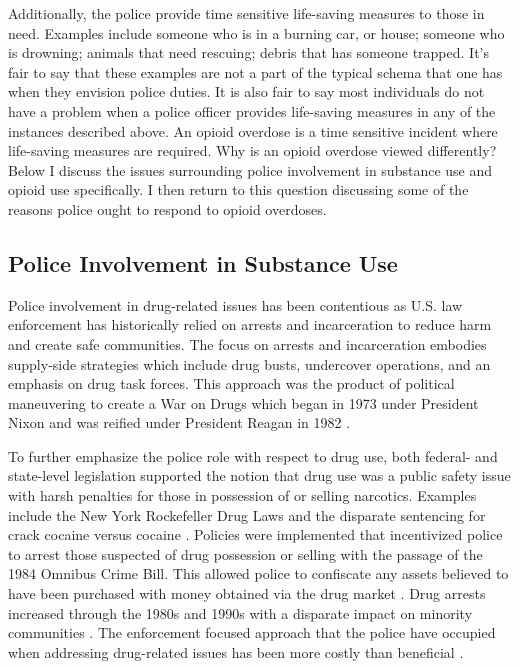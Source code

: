 Additionally, the police provide time sensitive life-saving measures to those in need. Examples include someone who is in a burning car, or house; someone who is drowning; animals that need rescuing; debris that has someone trapped. It's fair to say that these examples are not a part of the typical schema that one has when they envision police duties. It is also fair to say most individuals do not have a problem when a police officer provides life-saving measures in any of the instances described above. An opioid overdose is a time sensitive incident where life-saving measures are required. Why is an opioid overdose viewed differently? Below I discuss the issues surrounding police involvement in substance use and opioid use specifically. I then return to this question discussing some of the reasons police ought to respond to opioid overdoses. 
 
\subsection{Police Involvement in Substance Use}

Police involvement in drug-related issues has been contentious as U.S. law enforcement has historically relied on arrests and incarceration to reduce harm and create safe communities. The focus on arrests and incarceration embodies supply-side strategies which include drug busts, undercover operations, and an emphasis on drug task forces. This approach was the product of political maneuvering to create a War on Drugs which began in 1973 under President Nixon and was reified under President Reagan in 1982 \parencite{cooper_war_2015, lynch_theorizing_2012}.

To further emphasize the police role with respect to drug use, both federal- and state-level legislation supported the notion that drug use was a public safety issue with harsh penalties for those in possession of or selling narcotics. Examples include the New York Rockefeller Drug Laws \parencite{drucker_population_2002} and the disparate sentencing for crack cocaine versus cocaine \parencite{shein_racial_1993}. Policies were implemented that incentivized police to arrest those suspected of drug possession or selling with the passage of the 1984 Omnibus Crime Bill. This allowed police to confiscate any assets believed to have been purchased with money obtained via the drug market \parencite{beckett_politics_2003}. Drug arrests increased through the 1980s and 1990s with a disparate impact on minority communities \parencite{western_punishment_2006}. The enforcement focused approach that the police have occupied when addressing drug-related issues has been more costly than beneficial \parencite{baum_smoke_1996}.

